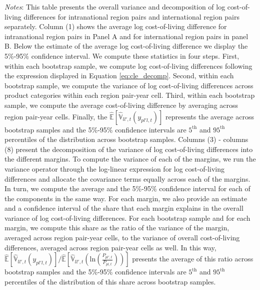 \begin{table}
{\begin{spacing}{1}
{         \textit{Notes}: This table presents the overall variance and decomposition of log cost-of-living differences for intranational region pairs and international region pairs separately. Column (1) shows the average log cost-of-living difference for intranational region pairs in Panel A and for international region pairs in panel B. Below the estimate of the average log cost-of-living difference we display the 5\%-95\% confidence interval. We compute these statistics in four steps. First, within each bootstrap sample, we compute log cost-of-living differences following the expression displayed in Equation \ref{eq:cle_decomp}. Second, within each bootstrap sample, we compute the variance of log cost-of-living differences across product categories within each region pair-year cell. Third, within each bootstrap sample, we compute the average cost-of-living difference by averaging across region pair-year cells. Finally, the $\hat{\mathbb{E}}\left[\hat{\mathbb{V}}_{ll',t}\left(y_{pl'l,t}\right)\right]$ represents the average across bootstrap samples and the 5\%-95\% confidence intervals are $5^{\text{th}}$ and $95^{\text{th}}$ percentiles of the distribution across bootstrap samples. Columns (3) - columns (8) present the decomposition of the variance of log cost-of-living differences into the different margins. To compute the variance of each of the margins, we run the variance operator through the log-linear expression for log cost-of-living differences and allocate the covariance terms equally across each of the margins. In turn, we compute the average and the 5\%-95\% confidence interval for each of the components in the same way. For each margin, we also provide an estimate and a confidence interval of the share that each margin explains in the overall variance of log cost-of-living differences. For each bootstrap sample and for each margin, we compute this share as the ratio of the variance of the margin, averaged across region pair-year cells, to the variance of overall cost-of-living differences, averaged across region pair-year cells as well. In this way, $\hat{\mathbb{E}}\left[\hat{\mathbb{V}}_{ll',t}\left(y_{pl'l,t}\right)\right]\bigg/\hat{\mathbb{E}}\left[\hat{\mathbb{V}}_{ll',t}\left(\text{ln}\left(\frac{P_{pl',t}}{P_{pl,t}}\right)\right)\right]$ presents the average of this ratio across bootstrap samples and the 5\%-95\% confidence intervals are $5^{\text{th}}$ and $95^{\text{th}}$ percentiles of the distribution of this share across bootstrap samples.}
    \end{spacing}}
\end{table}